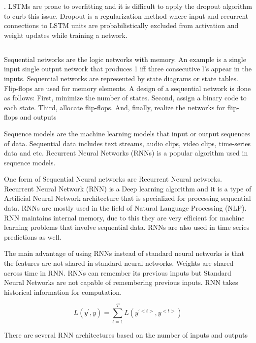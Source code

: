 \documentclass[12pt]{article}
\newcommand{\nd}{\noindent}
\newcommand{\msize}{\fontsize{14pt}{12pt}\selectfont}
\begin{document}
\nd 4. LSTMs are prone to overfitting and it is difficult to apply the dropout algorithm to curb this issue. Dropout is a regularization method where input and recurrent connections to LSTM units are probabilistically excluded from activation and weight updates while training a network.

\newpage 
\subsection{\msize{\textbf{\textbf{RECURRENT AND SEQUENTIAL NETWORKS}}}}
Sequential networks are the logic networks with memory. An example is a single input single output network that produces 1 iff three consecutive l’s appear in the inputs. Sequential networks are represented by state diagrams or state tables. Flip-flops are used for memory elements. A design of a sequential network is done as follows: First, minimize the number of states. Second, assign a binary code to each state. Third, allocate flip-flops. And, finally, realize the networks for flip-flops and outputs

\nd Sequence models are the machine learning models that input or output sequences of data. Sequential data includes text streams, audio clips, video clips, time-series data and etc. Recurrent Neural Networks (RNNs) is a popular algorithm used in sequence models.

\nd One form of Sequential Neural networks are Recurrent Neural networks. Recurrent Neural Network (RNN) is a Deep learning algorithm and it is a type of Artificial Neural Network architecture that is specialized for processing sequential data. RNNs are mostly used in the field of Natural Language Processing (NLP). RNN maintains internal memory, due to this they are very efficient for machine learning problems that involve sequential data. RNNs are also used in time series predictions as well.

\nd The main advantage of using RNNs instead of standard neural networks is that the features are not shared in standard neural networks. Weights are shared across time in RNN. RNNs can remember its previous inputs but Standard Neural Networks are not capable of remembering previous inputs. RNN takes historical information for computation. 

\begin{equation*}
L(y^{'} , y) = \sum_{t=1}^{T}{L(y^{'<t>},y^{<t>})}
\end{equation*}

\nd There are several RNN architectures based on the number of inputs and outputs 
\end{document}
